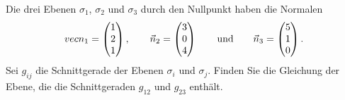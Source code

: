 Die drei Ebenen $\sigma_1$, $\sigma_2$ und $\sigma_3$ durch den Nullpunkt
haben die Normalen
\[
\\vec n_1=
\begin{pmatrix}1\\2\\1\end{pmatrix},
\qquad
\vec n_2=
\begin{pmatrix}3\\0\\4\end{pmatrix}
\qquad\text{und}\qquad
\vec n_3=
\begin{pmatrix}5\\1\\0\end{pmatrix}.
\]
Sei $g_{ij}$ die Schnittgerade der Ebenen $\sigma_i$ und $\sigma_j$.
Finden Sie die Gleichung der Ebene, die die Schnittgeraden $g_{12}$
und $g_{23}$ enthält.

